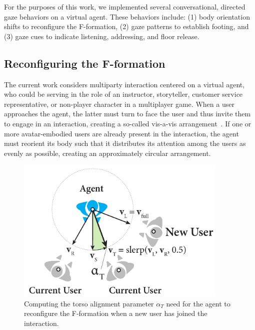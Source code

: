 For the purposes of this work, we implemented several conversational, directed gaze behaviors on a virtual agent. These behaviors include: (1) body orientation shifts to reconfigure the F-formation, (2) gaze patterns to establish footing, and (3) gaze cues to indicate listening, addressing, and floor release.

\subsection{Reconfiguring the F-formation}

The current work considers multiparty interaction centered on a virtual agent, who could be serving in the role of an instructor, storyteller, customer service representative, or non-player character in a multiplayer game. When a user approaches the agent, the latter must turn to face the user and thus invite them to engage in an interaction, creating a so-called vis-a-vis arrangement~\cite{kendon1990conducting}. If one or more avatar-embodied users are already present in the interaction, the agent must reorient its body such that it distributes its attention among the users as evenly as possible, creating an approximately circular arrangement.

\begin{figure}
\centering
\includegraphics[width=0.9\textwidth]{conversationalrolegaze/Figures/FTorsoAlign.pdf}
\caption{Computing the torso alignment parameter $\alpha_T$ need for the agent to reconfigure the F-formation when a new user has joined the interaction.}
\label{fig:FTorsoAlign}
\end{figure}

